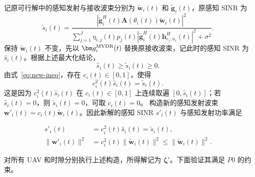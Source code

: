 记原可行解中的感知发射与接收波束分别为 $\tilde{\bm w}_i(t)$ 和 $\tilde{\bm g}_i(t)$，原感知 SINR 为
\begin{equation}\label{eq:new-old-sinr}
\tilde s_i(t)=\frac{\left|\tilde{\bm g}_i^H(t)\mathbf A(\theta_i(t))\tilde{\bm w}_i(t)\right|^2}{\displaystyle\sum_{j=1}^{J}\eta_{i,j}(t)p_j(t)\left|\tilde{\bm g}_i^H(t)\bm h_{c_j,u_i}^{H}(t)\right|^2+\sigma^2}.
\end{equation}
保持 $\tilde{\bm w}_i(t)$ 不变，先以 $\bm g_i^{\rm MVDR}(t)$ 替换原接收波束，记此时的感知 SINR 为 $\hat s_i(t)$。根据上述最大化结论，
\begin{equation}\label{eq:new-ineq}
\hat s_i(t)\ge\tilde s_i(t)\ge0.
\end{equation}
由式~\eqref{eq:new-ineq}，存在 $c_i(t)\in[0,1]$，使得
\begin{equation}\label{eq:new-scale}
c_i^2(t)\hat s_i(t)=\tilde s_i(t).
\end{equation}
这是因为 $c_i^2(t)\hat s_i(t)$ 在 $c_i(t)\in[0,1]$ 上连续取遍 $[0,\hat s_i(t)]$；若 $\hat s_i(t)=0$，则 $\tilde s_i(t)=0$，可取 $c_i(t)=0$。
构造新的感知发射波束 $\bm w'_i(t)=c_i(t)\tilde{\bm w}_i(t)$。因此新解的感知 SINR $s'_i(t)$ 与感知发射功率满足
\begin{samepage}
\begin{align}\label{eq:new-same-sinr}
s'_i(t)&=c_i^2(t)\hat s_i(t)=\tilde s_i(t),\\
\|\bm w'_i(t)\|^2&=c_i^2(t)\|\tilde{\bm w}_i(t)\|^2\le\|\tilde{\bm w}_i(t)\|^2.\label{eq:new-power}
\end{align}
\end{samepage}
对所有 UAV 和时隙分别执行上述构造，所得解记为 $\bm\zeta'$。下面验证其满足 $P0$ 的约束。

